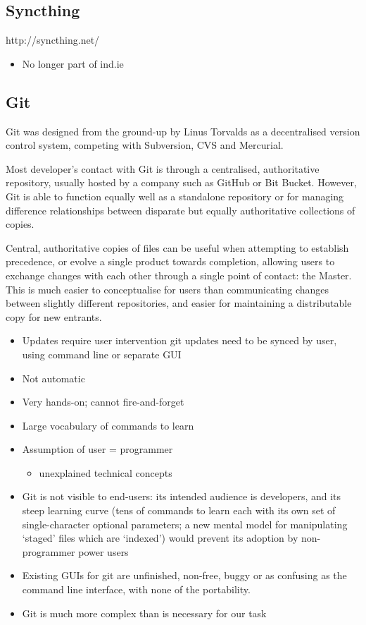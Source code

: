 \documentclass[12pt,a4paper,]{adreport}
\begin{document}
\subsection{Syncthing}\label{syncthing}

http://syncthing.net/

\begin{itemize}
\itemsep1pt\parskip0pt
\item
  No longer part of ind.ie
\end{itemize}

\subsection{Git}\label{git}

Git was designed from the ground-up by Linus Torvalds as a decentralised
version control system, competing with Subversion, CVS and Mercurial.

Most developer's contact with Git is through a centralised,
authoritative repository, usually hosted by a company such as GitHub or
Bit Bucket. However, Git is able to function equally well as a
standalone repository or for managing difference relationships between
disparate but equally authoritative collections of copies.

Central, authoritative copies of files can be useful when attempting to
establish precedence, or evolve a single product towards completion,
allowing users to exchange changes with each other through a single
point of contact: the Master. This is much easier to conceptualise for
users than communicating changes between slightly different
repositories, and easier for maintaining a distributable copy for new
entrants.

\begin{itemize}
\item
  Updates require user intervention git updates need to be synced by
  user, using command line or separate GUI
\item
  Not automatic
\item
  Very hands-on; cannot fire-and-forget
\item
  Large vocabulary of commands to learn
\item
  Assumption of user = programmer

  \begin{itemize}
  \itemsep1pt\parskip0pt
  \item
    unexplained technical concepts
  \end{itemize}
\item
  Git is not visible to end-users: its intended audience is developers,
  and its steep learning curve (tens of commands to learn each with its
  own set of single-character optional parameters; a new mental model
  for manipulating `staged' files which are `indexed') would prevent its
  adoption by non-programmer power users
\item
  Existing GUIs for git are unfinished, non-free, buggy or as confusing
  as the command line interface, with none of the portability.
\item
  Git is much more complex than is necessary for our task
\end{itemize}
\end{document}
